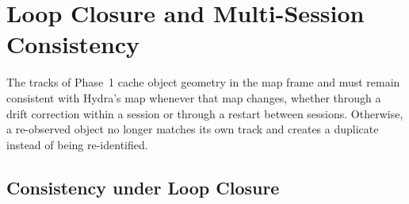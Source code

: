 
\section{Loop Closure and Multi-Session Consistency}
\label{sec:method_loopclosure}

{\small
The tracks of Phase~1 cache object geometry in the map frame and must remain consistent with Hydra's map whenever that map changes, whether through a drift correction within a session or through a restart between sessions. Otherwise, a re-observed object no longer matches its own track and creates a duplicate instead of being re-identified.
\par}

\subsection{Consistency under Loop Closure}
\label{subsec:method_loopclosure_reanchor}

